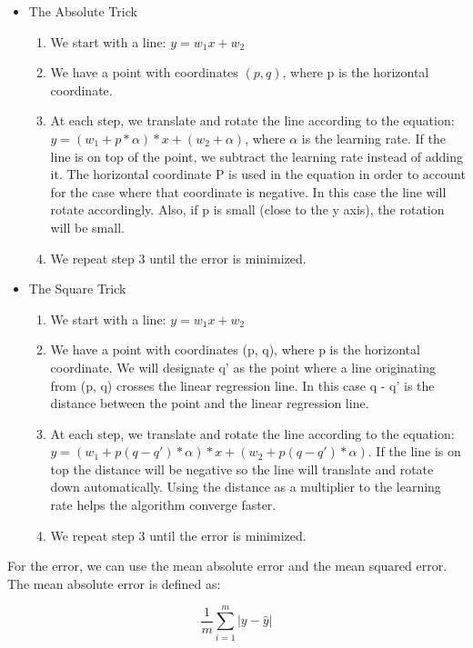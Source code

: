 \documentclass{article}
\begin{document}
\begin{itemize}
  \item The Absolute Trick
  \begin{enumerate}
    \item We start with a line: $y = w_1 x + w_2$
    \item We have a point with coordinates $(p, q)$, where p is the horizontal coordinate.
    \item At each step, we translate and rotate the line according to the equation: $y = (w_1 + p * \alpha) * x + (w_2 + \alpha)$, where $\alpha$ is the learning rate. If the line is on top of the point, we subtract the learning rate instead of adding it. The horizontal coordinate P is used in the equation in order to account for the case where that coordinate is negative. In this case the line will rotate accordingly. Also, if p is small (close to the y axis), the rotation will be small.
    \item We repeat step 3 until the error is minimized.
  \end{enumerate}
  \item The Square Trick
  \begin{enumerate}
    \item We start with a line: $y = w_1 x + w_2$
    \item We have a point with coordinates (p, q), where p is the horizontal coordinate. We will designate q’ as the point where a line originating from (p, q) crosses the linear regression line. In this case q - q’ is the distance between the point and the linear regression line.
    \item At each step, we translate and rotate the line according to the equation: $y = (w_1 + p (q - q') * \alpha) * x + (w_2 + p (q - q') * \alpha)$. If the line is on top the distance will be negative so the line will translate and rotate down automatically. Using the distance as a multiplier to the learning rate helps the algorithm converge faster.
    \item We repeat step 3 until the error is minimized.
  \end{enumerate}
\end{itemize}

For the error, we can use the mean absolute error and the mean squared error. The mean absolute error is defined as:

\begin{equation}
  \frac{1}{m}\sum_{i = 1}^{m}|y - \hat{y}|
\end{equation}
\end{document}
